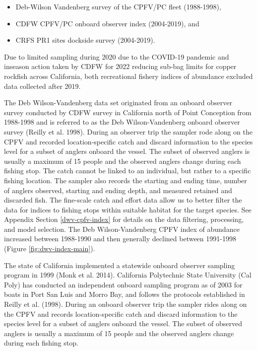 \documentclass[11pt,
  english,
  letterpaper,
]{article}
\providecommand{\tightlist}{%
  \setlength{\itemsep}{0pt}\setlength{\parskip}{0pt}}
\providecommand{\tightlist}{%
  \setlength{\itemsep}{0pt}\setlength{\parskip}{0pt}}
\begin{document}
\begin{itemize}
\tightlist
\item
  Deb-Wilson Vandenberg survey of the CPFV/PC fleet (1988-1998),
\item
  CDFW CPFV/PC onboard observer index (2004-2019), and
\item
  CRFS PR1 sites dockside survey (2004-2019).
\end{itemize}

Due to limited sampling during 2020 due to the COVID-19 pandemic and inseason action taken by CDFW for 2022 reducing sub-bag limits for copper rockfish across California, both recreational fishery indices of abundance excluded data collected after 2019.

The Deb Wilson-Vandenberg data set originated from an onboard observer survey conducted by CDFW survey in California north of Point Conception from 1988-1998 and is referred to as the Deb Wilson-Vandenberg onboard observer survey (Reilly et al. 1998). During an observer trip the sampler rode along on the CPFV and recorded location-specific catch and discard information to the species level for a subset of anglers onboard the vessel. The subset of observed anglers is usually a maximum of 15 people and the observed anglers change during each fishing stop. The catch cannot be linked to an individual, but rather to a specific fishing location. The sampler also records the starting and ending time, number of anglers observed, starting and ending depth, and measured retained and discarded fish. The fine-scale catch and effort data allow us to better filter the data for indices to fishing stops within suitable habitat for the target species. See Appendix Section \ref{dwv-cpfv-index} for details on the data filtering, processing, and model selection. The Deb Wilson-Vandenberg CPFV index of abundance increased between 1988-1990 and then generally declined between 1991-1998 (Figure \ref{fig:dwv-index-main}).

The state of California implemented a statewide onboard observer sampling program in 1999 (Monk et al. 2014). California Polytechnic State University (Cal Poly) has conducted an independent onboard sampling program as of 2003 for boats in Port San Luis and Morro Bay, and follows the protocols established in Reilly et al. (1998). During an onboard observer trip the sampler rides along on the CPFV and records location-specific catch and discard information to the species level for a subset of anglers onboard the vessel. The subset of observed anglers is usually a maximum of 15 people and the observed anglers change during each fishing stop.
\end{document}
